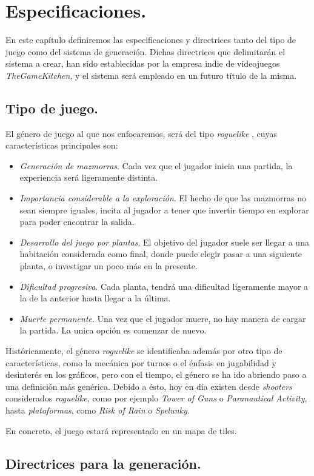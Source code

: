 \chapter{Especificaciones.}\label{cap:capitulo2}

En este capítulo definiremos las especificaciones y directrices tanto del tipo de juego como del sistema de generación. Dichas directrices que delimitarán el sistema a crear, han sido establecidas por la empresa indie de videojuegos \emph{TheGameKitchen}, y el sistema será empleado en un futuro título de la misma.

\section{Tipo de juego.}

El género de juego al que nos enfocaremos, será del tipo \emph{roguelike} \cite{rlike}, cuyas características principales son:

\begin{itemize}
	\item \emph{Generación de mazmorras}. Cada vez que el jugador inicia una partida, la experiencia será ligeramente distinta.
	\item \emph{Importancia considerable a la exploración}. El hecho de que las mazmorras no sean siempre iguales, incita al jugador a tener que invertir tiempo en explorar para poder encontrar la salida.
	\item \emph{Desarrollo del juego por plantas}. El objetivo del jugador suele ser llegar a una habitación considerada como final, donde puede elegir pasar a una siguiente planta, o investigar un poco más en la presente.
	\item \emph{Dificultad progresiva}. Cada planta, tendrá una dificultad ligeramente mayor a la de la anterior hasta llegar a la última.
	\item \emph{Muerte permanente}. Una vez que el jugador muere, no hay manera de cargar la partida. La unica opción es comenzar de nuevo.
\end{itemize}

Históricamente, el género \emph{roguelike} se identificaba además por otro tipo de características, como la mecánica por turnos o el énfasis en jugabilidad y desinterés en los gráficos, pero con el tiempo, el género se ha ido abriendo paso a una definición más genérica. Debido a ésto, hoy en día existen desde \emph{shooters} considerados \emph{roguelike}, como por ejemplo \emph{Tower of Guns} o \emph{Paranautical Activity}, hasta \emph{plataformas}, como \emph{Risk of Rain} o \emph{Spelunky}.

En concreto, el juego estará representado en un mapa de tiles.


\section{Directrices para la generación.}

